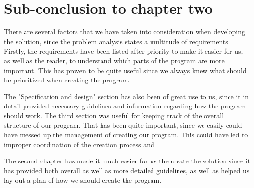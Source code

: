 \section{Sub-conclusion to chapter two}
There are several factors that we have taken into consideration when developing the solution, since the problem analysis states a multitude of requirements. Firstly, the requirements have been listed after priority to make it easier for us, as well as the reader, to understand which parts of the program are more important. This has proven to be quite useful since we always knew what should be prioritized when creating the program.

The "Specification and design" section has also been of great use to us, since it in detail provided necessary guidelines and information regarding how the program should work. The third section was useful for keeping track of the overall structure of our program. That has been quite important, since we easily could have messed up the management of creating our program. This could have led to improper coordination of the creation process and

The second chapter has made it much easier for us the create the solution since it has provided both overall as well as more detailed guidelines, as well as helped us lay out a plan of how we should create the program.